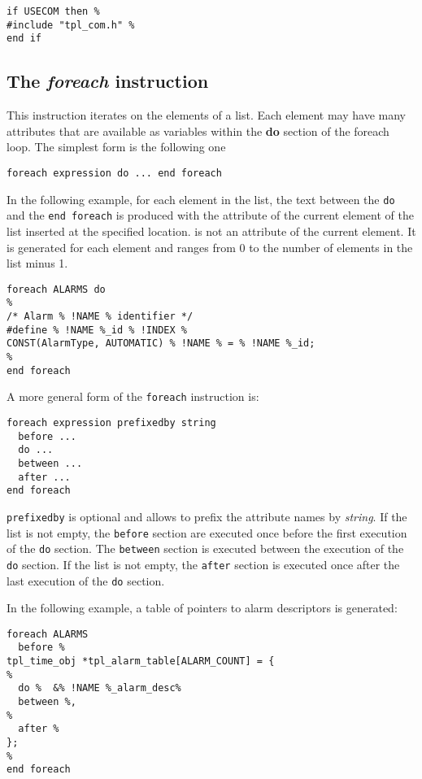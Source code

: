 \begin{lstlisting}
if USECOM then %
#include "tpl_com.h" %
end if
\end{lstlisting}

\subsection{The {\em foreach} instruction}

This instruction iterates on the elements of a list. Each element may have many attributes that are available as variables within the {\bf do} section of the foreach loop. The simplest form is the following one

\begin{lstlisting}
foreach expression do ... end foreach
\end{lstlisting}

In the following example, for each element in the  list, the text between the {\tt do} and the {\tt end foreach} is produced with the  attribute of the current element of the  list inserted at the specified location.  is not an attribute of the current element. It is generated for each element and ranges from 0 to the number of elements in the list minus 1.
\begin{lstlisting}
foreach ALARMS do
%
/* Alarm % !NAME % identifier */
#define % !NAME %_id % !INDEX %
CONST(AlarmType, AUTOMATIC) % !NAME % = % !NAME %_id;
%
end foreach
\end{lstlisting}

A more general form of the {\tt foreach} instruction is:

\begin{lstlisting}
foreach expression prefixedby string
  before ...
  do ...
  between ...
  after ...
end foreach
\end{lstlisting}

{\tt prefixedby} is optional and allows to prefix the attribute names by {\em string}. If the list is not empty, the {\tt before} section are executed once before the first execution of the {\tt do} section. The {\tt between} section is executed between the execution of the {\tt do} section.  If the list is not empty, the {\tt after} section is executed once after the last execution of the {\tt do} section.

In the following example, a table of pointers to alarm descriptors is generated:

\begin{lstlisting}
foreach ALARMS
  before %
tpl_time_obj *tpl_alarm_table[ALARM_COUNT] = {
%
  do %  &% !NAME %_alarm_desc%
  between %,
%
  after %
};
%
end foreach
\end{lstlisting}

